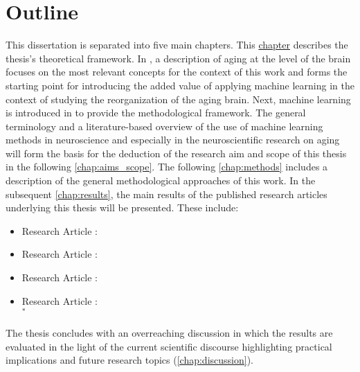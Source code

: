 \section{Outline}
This dissertation is separated into five main chapters. This \hyperref[chap:intro]{chapter} describes the thesis's theoretical framework. In , a description of aging at the level of the brain focuses on the most relevant concepts for the context of this work and forms the starting point for introducing the added value of applying machine learning in the context of studying the reorganization of the aging brain. Next, machine learning is introduced in  to provide the methodological framework. The general terminology and a literature-based overview of the use of machine learning methods in neuroscience and especially in the neuroscientific research on aging will form the basis for the deduction of the research aim and scope of this thesis in the following \autoref{chap:aims_scope}. The following \autoref{chap:methods} includes a description of the general methodological approaches of this work. In the subsequent \autoref{chap:results}, the main results of the published research articles underlying this thesis will be presented. These include:

\begin{itemize}
\item Research Article :\\ \hyperref[pub:paperI]{}
\newpage
\item Research Article :\\ \hyperref[pub:paperI]{}
\item Research Article :\\ \hyperref[pub:paperI]{}
\item Research Article :\\ \hyperref[pub:paperI]{}$^*$
\end{itemize}

\noindent The thesis concludes with an overreaching discussion in which the results are evaluated in the light of the current scientific discourse highlighting practical implications and future research topics (\autoref{chap:discussion}). 
